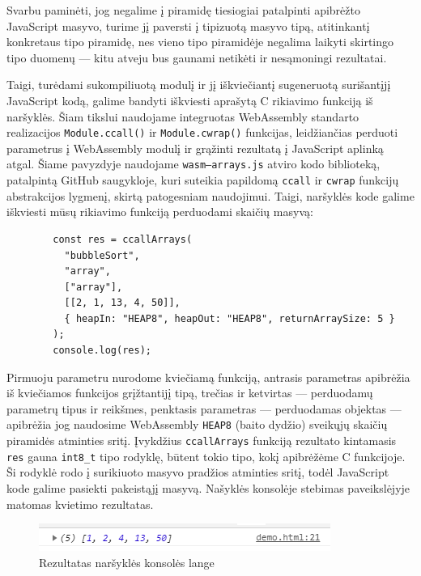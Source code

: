 \documentclass{VUMIFPSkursinis}
\begin{document}
Svarbu paminėti, jog negalime į piramidę tiesiogiai patalpinti apibrėžto JavaScript masyvo, turime jį paversti į tipizuotą masyvo tipą, atitinkantį konkretaus tipo piramidę, nes vieno tipo piramidėje negalima laikyti skirtingo tipo duomenų — kitu atveju bus gaunami netikėti ir nesąmoningi rezultatai. 

Taigi, turėdami sukompiliuotą modulį ir jį iškviečiantį sugeneruotą surišantįjį JavaScript kodą, galime bandyti iškviesti aprašytą C rikiavimo funkciją iš naršyklės. Šiam tikslui naudojame integruotas WebAssembly standarto realizacijos \verb|Module.ccall()| ir \verb|Module.cwrap()| funkcijas, leidžiančias perduoti parametrus į WebAssembly modulį ir grąžinti rezultatą į JavaScript aplinką atgal. Šiame pavyzdyje naudojame \verb|wasm—arrays.js| atviro kodo biblioteką, patalpintą GitHub saugykloje, kuri suteikia papildomą \verb|ccall| ir \verb|cwrap| funkcijų abstrakcijos lygmenį, skirtą patogesniam naudojimui. \cite{WAA19} Taigi, naršyklės kode galime iškviesti mūsų rikiavimo funkciją perduodami skaičių masyvą:

\begin{center}
\begin{small}
\begin{verbatim}
        const res = ccallArrays(
          "bubbleSort",
          "array",
          ["array"],
          [[2, 1, 13, 4, 50]],
          { heapIn: "HEAP8", heapOut: "HEAP8", returnArraySize: 5 }
        );
        console.log(res);
\end{verbatim}
\end{small}
\end{center}

Pirmuoju parametru nurodome kviečiamą funkciją, antrasis parametras apibrėžia iš kviečiamos funkcijos grįžtantijį tipą, trečias ir ketvirtas — perduodamų parametrų tipus ir reikšmes, penktasis parametras — perduodamas objektas — apibrėžia jog naudosime WebAssembly \verb|HEAP8| (baito dydžio) sveikųjų skaičių piramidės atminties sritį. Įvykdžius \verb|ccallArrays| funkciją rezultato kintamasis \verb|res| gauna \verb|int8_t| tipo rodyklę, būtent tokio tipo, kokį apibrėžėme C funkcijoje. Ši rodyklė rodo į surikiuoto masyvo pradžios atminties sritį, todėl JavaScript kode galime pasiekti pakeistąjį masyvą. Našyklės konsolėje stebimas paveikslėjyje matomas kvietimo rezultatas.

\begin{figure}[h!]
  \begin{center}
  \includegraphics[scale=1]{sorted_array.png}
  \end{center}
  \caption{Rezultatas naršyklės konsolės lange}
  \label{fig:sorted_array}
\end{figure}
\end{document}
